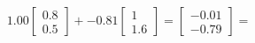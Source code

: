 \documentclass[preview]{standalone}
\begin{document}
\begin{align*}
1.00 \begin{bmatrix} 0.8 \\ 0.5 \end{bmatrix} + -0.81 \begin{bmatrix} 1 \\ 1.6 \end{bmatrix} = \begin{bmatrix} -0.01 \\ -0.79 \end{bmatrix} =
\end{align*}
\end{document}
